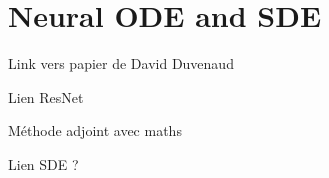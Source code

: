 \chapter{Neural ODE and SDE}\label{sec:Neural Ordinary Differential Equation}

Link vers papier de David Duvenaud

Lien ResNet

Méthode adjoint avec maths

Lien SDE ?